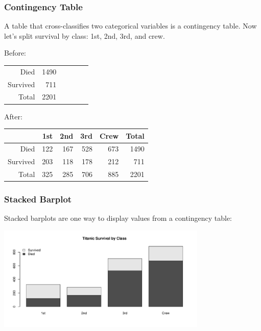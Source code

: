 \documentclass[handout]{beamer}
\newcommand{\blue}[1]{\textcolor{blue2}{#1}}
\begin{document}
\begin{frame}[fragile]
\frametitle{Contingency Table}
A table that \blue{cross-classifies} two categorical variables is a \blue{contingency table}.  Now let's split survival by class: 1st, 2nd, 3rd, and crew.

\pause \vspace{0.25cm}

Before:
\begin{center}
\begin{tabular}{r|rrrr|r}
Died & 1490 \\
  Survived & 711 \\  
   \hline
  Total & 2201 \\
\end{tabular}
\end{center}

After:
\begin{center}
\begin{tabular}{r|rrrr|r}
 & 1st & 2nd & 3rd & Crew & Total \\ 
  \hline
Died & 122 & 167 & 528 & 673 & 1490 \\ 
  Survived & 203 & 118 & 178 & 212 & 711 \\ 
   \hline
  Total & 325 & 285 & 706 & 885 & 2201 \\ 
\end{tabular}
\end{center}
  
\end{frame}


\begin{frame}[fragile]
\frametitle{Stacked Barplot}
\blue{Stacked barplots} are one way to display values from a contingency table:

\begin{center}
\includegraphics[width=10cm]{figure/barplot2.pdf}
\end{center}

\end{frame}
\end{document}
